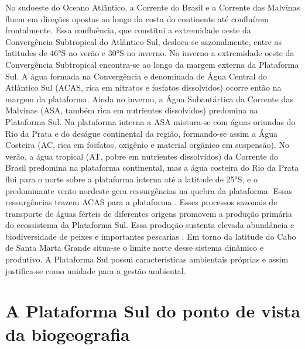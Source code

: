 \documentclass[a4paper,11pt,twoside,showtrims,onecolumn,openright,final]{memoir}
\begin{document}
No sudoeste do Oceano Atlântico, a Corrente do Brasil e a Corrente das Malvinas 
fluem em direções opostas ao longo da costa do continente até confluírem frontalmente. 
Essa confluência, que constitui a extremidade oeste da Convergência Subtropical do Atlântico Sul, 
desloca-se sazonalmente, entre as latitudes de 46°S no verão e 30°S no inverno. No inverno 
a extremidade oeste da Convergência Subtropical encontra-se ao longo da margem externa da 
Plataforma Sul. A água formada na Convergência e denominada de Água Central do Atlântico Sul 
(ACAS, rica em nitratos e fosfatos dissolvidos) ocorre então na margem da plataforma. 
Ainda no inverno, a Água Subantártica da Corrente das Malvinas 
(ASA, também rica em nutrientes dissolvidos) predomina na Plataforma Sul. 
Na plataforma interna a ASA mistura-se com águas oriundas do Rio da Prata e 
do deságue continental  da região, formando-se assim a Água Costeira 
(AC, rica em fosfatos, oxigênio e material orgânico em suspensão). 
No verão, a água tropical (AT, pobre em nutrientes dissolvidos) da Corrente do Brasil 
predomina na plataforma continental, mas a água costeira do Rio da Prata flui para o norte 
sobre a plataforma interna até a latitude de 25°S, e o predominante vento nordeste gera 
ressurgências na quebra da plataforma. Essas ressurgências trazem ACAS 
para a plataforma \citep{garcia1997,niencheski1997,ZAVIALOV1998}. %
Esses processos sazonais de transporte de águas férteis de diferentes origens promovem a 
produção primária do ecossistema da Plataforma Sul. Essa produção sustenta elevada abundância 
e biodiversidade de peixes e importantes pescarias \citep{odebrecht2001}. %
Em torno da latitude do Cabo de Santa Marta Grande  situa-se o limite norte desse sistema 
dinâmico e produtivo. A Plataforma Sul possui características ambientais próprias e 
assim justifica-se como unidade para a gestão ambiental.

\section*{A Plataforma Sul do ponto de vista da biogeografia}
\end{document}
